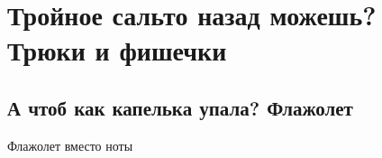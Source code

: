 \chapter{Тройное сальто назад можешь? Трюки и фишечки}
\label{ch:tricks}


\section{А чтоб как капелька упала? Флажолет}
\label{ch:tricks:flageolet}

Флажолет вместо ноты
